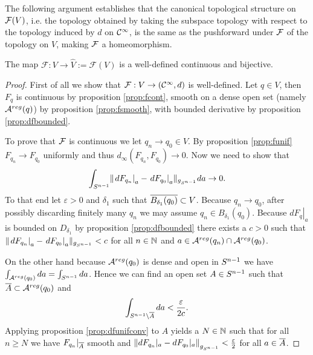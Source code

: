 The following argument establishes that the canonical topological structure on ${\mathcal{F}}(V)$, i.e. the topology obtained by taking the subspace topology with respect to the topology induced by $d$ on ${\mathcal{C}}^\infty$, is the same as the pushforward under ${\mathcal{F}}$ of the topology on $V$, making ${\mathcal{F}}$ a homeomorphism.
\begin{lemma}\label{lem:Fprop}
The map $\mathcal{F}:V\to\widehat{V}:=\mathcal{F}(V)$ is a well-defined continuous and bijective.
\end{lemma}
\begin{proof}
First of all we show that $\mathcal{F}:V\to ({\mathcal{C}}^\infty,d)$ is well-defined. Let $q\in V$, then $F_q$ is continuous by proposition \ref{prop:fcont}, smooth on a dense open set (namely ${{\mathcal{A}}^{reg}}(q)$) by proposition \ref{prop:fsmooth}, with bounded derivative by proposition \ref{prop:dfbounded}.

To prove that $\mathcal{F}$ is continuous we let $q_n\to q_0 \in V$. By proposition \ref{prop:funif} $F_{q_n}\to F_{q_0}$ uniformly and thus $d_\infty(F_{q_n},F_{q_0})\to 0$. Now we need to show that 
\[
    \int_{{S^{n-1}}} \lVert \left.dF_{q_n}\right\rvert_a - \left.dF_{q_0}\right\rvert_a \rVert_{g_{S^{n-1}}}da \to 0.
\]
To that end let $\varepsilon>0$ and $\delta_1$ such that ${\overline{B_{\delta_1}(q_0)}}\subset V$. Because $q_n\to q_0$, after possibly discarding finitely many $q_n$ we may assume $q_n \in B_{\delta_1}(q_0)$. 
Because $\left.dF_{q}\right\rvert_a$ is bounded on $D_{\delta_1}$ by proposition \ref{prop:dfbounded} there exists a $c>0$ such that $\lVert \left.dF_{q_n}\right\rvert_a - \left.dF_{q_0}\right\rvert_a \rVert_{g_{S^{n-1}}}<c$ for all $n\in \mathbb{N}$ and $a\in {{\mathcal{A}}^{reg}}(q_n)\cap {{\mathcal{A}}^{reg}}(q_0)$. 

On the other hand because ${{\mathcal{A}}^{reg}}(q_0)$ is dense and open in ${S^{n-1}}$ we have $\int_{{{\mathcal{A}}^{reg}}(q_0)}da=\int_{{S^{n-1}}}da$. Hence we can find an open set $A\in {S^{n-1}}$ such that ${\overline{A}}\subset {{\mathcal{A}}^{reg}}(q_0)$ and 
\[
    \int_{{S^{n-1}} \setminus {\overline{A}}}da< \frac{\varepsilon}{2c}.
\]
Applying proposition \ref{prop:dfunifconv} to $A$ yields a $N\in \mathbb{N}$ such that for all $n\ge N$ we have $F_{q_n}\rvert_{{\overline{A}}}$ smooth and $\left\lVert dF_{q_n}\rvert_{a} - dF_{q_0}\rvert_{a}\right\rVert_{g_{{S^{n-1}}}}<\frac{\varepsilon}{2}$ for all $a\in {\overline{A}}$.


\end{proof}
